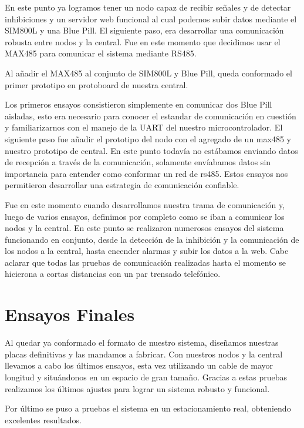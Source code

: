 En este punto ya logramos tener un nodo capaz de recibir señales y de detectar inhibiciones y un servidor web funcional al cual podemos subir datos
mediante el SIM800L y una Blue Pill. El siguiente paso, era desarrollar una comunicación robusta entre nodos y la central. Fue en este momento que decidimos
usar el MAX485 para comunicar el sistema mediante RS485.\par
Al añadir el MAX485 al conjunto de SIM800L y Blue Pill, queda conformado el primer prototipo en protoboard de nuestra central.\par
Los primeros ensayos consistieron simplemente en comunicar dos Blue Pill aisladas, esto era necesario para conocer el estandar de comunicación en cuestión
y familiarizarnos con el manejo de la UART del nuestro microcontrolador. El siguiente paso fue añadir el prototipo del nodo con el agregado de un max485
y nuestro prototipo de central. En este punto todavía no estábamos enviando datos de recepción a través de la comunicación, solamente envíabamos datos
sin importancia para entender como conformar un red de rs485. Estos ensayos nos permitieron desarrollar una estrategia de comunicación confiable.\par
Fue en este momento cuando desarrollamos nuestra trama de comunicación y, luego de varios ensayos, definimos por completo como se iban a comunicar los nodos
y la central. En este punto se realizaron numerosos ensayos del sistema funcionando en conjunto, desde la detección de la inhibición y la comunicación de los nodos
a la central, hasta encender alarmas y subir los datos a la web.
Cabe aclarar que todas las pruebas de comunicación realizadas hasta el momento se hicierona a cortas distancias con un par trensado telefónico.

\section{Ensayos Finales}

Al quedar ya conformado el formato de nuestro sistema, diseñamos nuestras placas definitivas y las mandamos a fabricar. Con nuestros nodos y la central
llevamos a cabo los últimos ensayos, esta vez utilizando un cable de mayor longitud y situándonos en un espacio de gran tamaño.
Gracias a estas pruebas realizamos los últimos ajustes para lograr un sistema robusto y funcional. \par
Por último se puso a pruebas el sistema en un estacionamiento real, obteniendo excelentes resultados.


